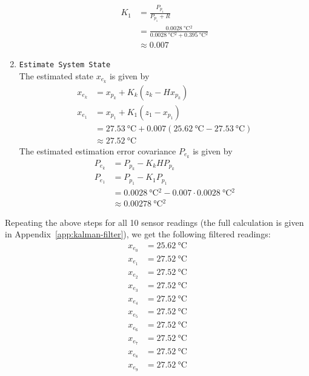 \documentclass[12pt,a4paper]{article}
\begin{document}
\begin{enumerate}
\begin{align*}
        K_1 &= \frac{P_{p_1}}{P_{p_1} + R} \\
            &= \frac{\SI{0.0028}{\degreeCelsius^2}}{\SI{0.0028}{\degreeCelsius^2} + \SI{0.395}{\degreeCelsius^2}} \\
            &\approx 0.007
    \end{align*}
    \item \texttt{Estimate System State} \\
    The estimated state $x_{e_k}$ is given by
    \begin{align*}
        x_{e_k} &= x_{p_k} + K_k (z_k - H x_{p_k}) \\
        x_{e_1} &= x_{p_1} + K_1 (z_1 - x_{p_1}) \\
                &= \SI{27.53}{\degreeCelsius} + 0.007 (\SI{25.62}{\degreeCelsius} - \SI{27.53}{\degreeCelsius}) \\
                &\approx \SI{27.52}{\degreeCelsius}
    \end{align*}
    The estimated estimation error covariance $P_{e_k}$ is given by
    \begin{align*}
        P_{e_k} &= P_{p_k} - K_k H P_{p_k} \\
        P_{e_1} &= P_{p_1} - K_1 P_{p_1} \\
                &= \SI{0.0028}{\degreeCelsius^2} - 0.007 \cdot \SI{0.0028}{\degreeCelsius^2} \\
                &\approx \SI{0.00278}{\degreeCelsius^2}
    \end{align*}
\end{enumerate}

Repeating the above steps for all 10 sensor readings (the full calculation is given in Appendix~\ref{app:kalman-filter}), we get the following filtered readings:
\begin{align*}
    x_{e_0} &= \SI{25.62}{\degreeCelsius} \\
    x_{e_1} &= \SI{27.52}{\degreeCelsius} \\
    x_{e_2} &= \SI{27.52}{\degreeCelsius} \\
    x_{e_3} &= \SI{27.52}{\degreeCelsius} \\
    x_{e_4} &= \SI{27.52}{\degreeCelsius} \\
    x_{e_5} &= \SI{27.52}{\degreeCelsius} \\
    x_{e_6} &= \SI{27.52}{\degreeCelsius} \\
    x_{e_7} &= \SI{27.52}{\degreeCelsius} \\
    x_{e_8} &= \SI{27.52}{\degreeCelsius} \\
    x_{e_9} &= \SI{27.52}{\degreeCelsius}
\end{align*}
\end{document}
